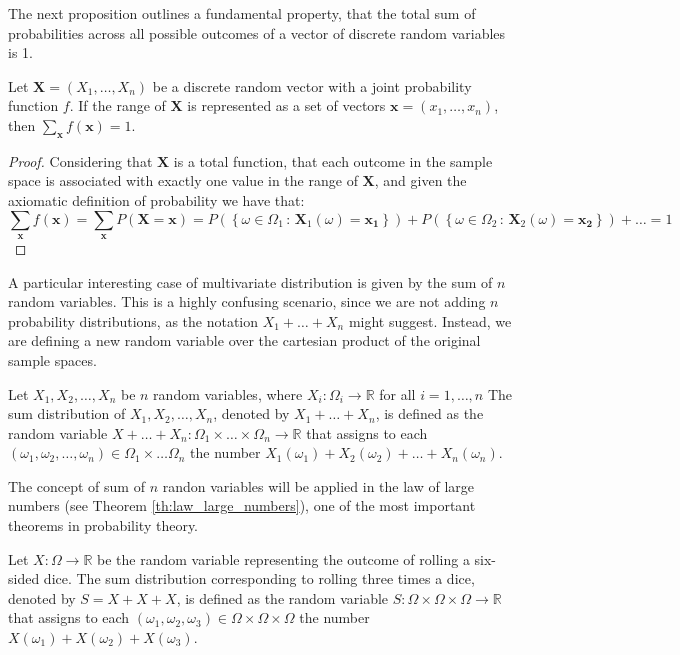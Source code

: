 The next proposition outlines a fundamental property, that the total sum of probabilities across all possible outcomes of a vector of discrete random variables is 1.

\begin{proposition}
Let $\mathbf{X}=\left(X_{1}, \ldots, X_{n}\right)$ be a discrete random vector with a joint probability function $f$. If the range of $\mathbf{X}$ is represented as a set of vectors $\mathbf{x} = (x_{1}, \ldots, x_{n})$, then $\sum_{\mathbf{x}}f\left(\mathbf{x}\right)=1$.
\end{proposition}
\begin{proof}
Considering that $\mathbf{X}$ is a total function, that each outcome in the sample space is associated with exactly one value in the range of $\mathbf{X}$, and given the axiomatic definition of probability we have that:
\[
\sum_{\mathbf{x}} f(\mathbf{x}) = \sum_{\mathbf{x}} P\left( \mathbf{X} = \mathbf{x} \right) = P \left( \left\{ \omega \in \Omega_1 \,:\, \mathbf{X}_1(\omega) = \mathbf{x_1} \right\} \right) + P \left( \left\{ \omega \in \Omega_2 \,:\, \mathbf{X}_2(\omega) = \mathbf{x_2} \right\} \right) + \ldots = 1 
\]
\end{proof}

A particular interesting case of multivariate distribution is given by the sum of $n$ random variables. This is a highly confusing scenario, since we are not adding $n$ probability distributions, as the notation $X_1 + \ldots + X_n$ might suggest. Instead, we are defining a new random variable over the cartesian product of the original sample spaces.

\begin{definition}
Let $X_1, X_2, \ldots, X_n$ be $n$ random variables, where $X_i : \Omega_i \rightarrow \mathbb{R}$ for all $i=1, \ldots, n$ The sum distribution of $X_1, X_2, \ldots, X_n$, denoted by $X_1 + \ldots + X_n$, is defined as the random variable $X + \ldots + X_n : \Omega_1 \times \ldots \times \Omega_n \rightarrow \mathbb{R}$ that assigns to each $\left( \omega_1, \omega_2, \ldots, \omega_n \right) \in \Omega_1 \times \ldots \Omega_n$ the number $X_1 \left( \omega_1 \right) + X_2 \left( \omega_2 \right) + \ldots + X_n \left( \omega_n \right)$.
\end{definition}

The concept of sum of $n$ randon variables will be applied in the law of large numbers (see Theorem \ref{th:law_large_numbers}), one of the most important theorems in probability theory.

\begin{example}
Let $X: \Omega \rightarrow \mathbb{R}$ be the random variable representing the outcome of rolling a six-sided dice. The sum distribution corresponding to rolling three times a dice, denoted by $S = X + X + X$, is defined as the random variable $S: \Omega \times \Omega \times \Omega \rightarrow \mathbb{R}$ that assigns to each $\left( \omega_1, \omega_2, \omega_3 \right) \in \Omega \times \Omega \times \Omega$ the number $X \left( \omega_1 \right) + X \left( \omega_2 \right) + X \left( \omega_3 \right)$.
\end{example}

